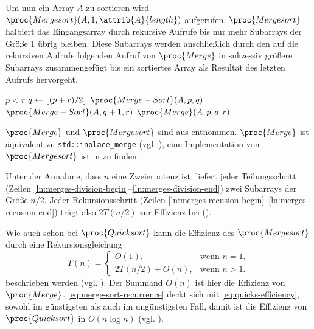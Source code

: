 Um nun ein Array $A$ zu sortieren wird $\proc{Mergesort}(A, 1, \attrib{A}{length})$ aufgerufen. $\proc{Mergesort}$ halbiert das Eingangsarray durch rekursive Aufrufe bis nur mehr Subarrays der Größe 1 übrig bleiben. Diese Subarrays werden anschließlich durch den auf die rekursiven Aufrufe folgenden Aufruf von $\proc{Merge}$ in sukzessiv größere Subarrays zusammengefügt bis ein sortiertes Array als Resultat des letzten Aufrufs hervorgeht.

\begin{codebox}
    \li \If $p < r$
    \li     \Do
                $q \gets \left\lfloor (p + r) / 2 \right\rfloor$\label{ln:merges-division-begin}
    \li         $\proc{Merge-Sort}(A, p, q)$\label{ln:merges-recusion-begin}
    \li         $\proc{Merge-Sort}(A, q + 1, r)$\label{ln:merges-division-end}\label{ln:merges-recusion-end}
    \li         $\proc{Merge}(A, p, q, r)$
            \End
\end{codebox}

$\proc{Merge}$ und $\proc{Mergesort}$ sind aus \cite[33f]{clrs2001} entnommen. $\proc{Merge}$ ist äquivalent zu \lstinline{std::inplace_merge} (vgl. \cite[929]{ISO-C++17}), eine Implementation von $\proc{Mergesort}$ ist in  zu finden.

Unter der Annahme, dass $n$ eine Zweierpotenz ist, liefert jeder Teilungsschritt (Zeilen \ref{ln:merges-division-begin}--\ref{ln:merges-division-end}) zwei Subarrays der Größe $n / 2$. Jeder Rekursionsschritt (Zeilen \ref{ln:merges-recusion-begin}--\ref{ln:merges-recusion-end}) trägt also $2T(n / 2)$ zur Effizienz bei (\cite[36]{clrs2001}).

Wie auch schon bei $\proc{Quicksort}$ kann die Effizienz des $\proc{Mergesort}$ durch eine Rekursionsgleichung
\begin{equation}\label{eq:merge-sort-recurrence}
    T(n) = \begin{cases}
        O(1), & \text{wenn $n = 1$},\\
        2T(n/2) + O(n), & \text{wenn $n > 1$}.
    \end{cases}
\end{equation}
beschrieben werden (vgl. \cite[36]{clrs2001}). Der Summand $O(n)$ ist hier die Effizienz von $\proc{Merge}$. \eqref{eq:merge-sort-recurrence} deckt sich mit \eqref{eq:quicks-efficiency}, sowohl im günstigsten als auch im ungünstigsten Fall, damit ist die Effizienz von $\proc{Quicksort}$ in $O(n \log n)$ (vgl. \cite[36]{clrs2001}).
